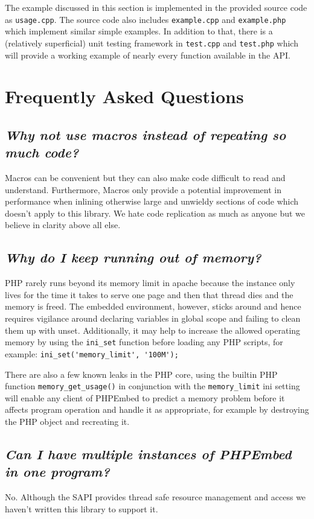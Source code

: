 \documentclass[11pt,titlepage]{article}
\begin{document}
The example discussed in this section is implemented in the provided source code as \verb|usage.cpp|. The source code also includes \verb|example.cpp| and \verb|example.php| which implement similar simple examples. In addition to that, there is a (relatively superficial) unit testing framework in \verb|test.cpp| and \verb|test.php| which will provide a working example of nearly every function available in the API. 

\section{Frequently Asked Questions}

\subsection{\emph{Why not use macros instead of repeating so much code?}}
Macros can be convenient but they can also make code difficult to read and understand. Furthermore, Macros only provide a potential improvement in performance when inlining otherwise large and unwieldy sections of code which doesn't apply to this library. We hate code replication as much as anyone but we believe in clarity above all else.

\subsection{\emph{Why do I keep running out of memory?}}
PHP rarely runs beyond its memory limit in apache because the instance only lives for the time it takes to serve one page and then that thread dies and the memory is freed. The embedded environment, however, sticks around and hence requires vigilance around declaring variables in global scope and failing to clean them up with unset. Additionally, it may help to increase the allowed operating memory by using the \verb|ini_set| function before loading any PHP scripts, for example: \verb|ini_set('memory_limit', '100M');|

There are also a few known leaks in the PHP core, using the builtin PHP function \verb|memory_get_usage()| in conjunction with the \verb|memory_limit| ini setting will enable any client of PHPEmbed to predict a memory problem before it affects program operation and handle it as appropriate, for example by destroying the PHP object and recreating it.

\subsection{\emph{Can I have multiple instances of PHPEmbed in one program?}}
No. Although the SAPI provides thread safe resource management and access we haven't written this library to support it.
\end{document}
